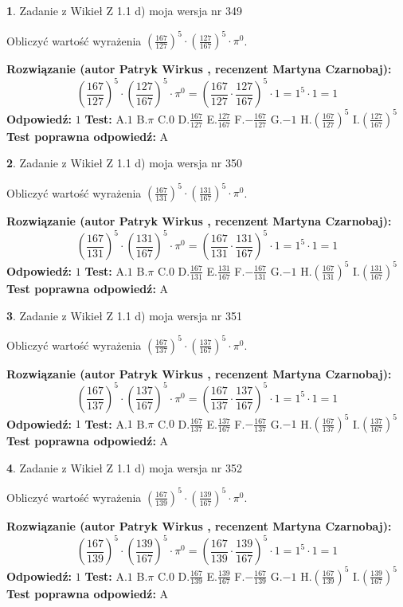 \documentclass[12pt, a4paper]{article}
\theoremstyle{definition} %
\newtheorem{zad}{}
\newcommand{\zadStart}[1]{\begin{zad}#1\newline}
\newcommand{\zadStop}{\end{zad}}
\newcommand{\rozwStart}[2]{\noindent \textbf{Rozwiązanie (autor #1 , recenzent #2): }\newline}
\newcommand{\rozwStop}{\newline}
\newcommand{\odpStart}{\noindent \textbf{Odpowiedź:}\newline}
\newcommand{\odpStop}{\newline}
\newcommand{\testStart}{\noindent \textbf{Test:}\newline}
\newcommand{\testStop}{\newline}
\newcommand{\kluczStart}{\noindent \textbf{Test poprawna odpowiedź:}\newline}
\newcommand{\kluczStop}{\newline}
\begin{document}
\zadStart{Zadanie z Wikieł Z 1.1 d) moja wersja nr 349}

Obliczyć wartość wyrażenia $(\frac{167}{127})^{5} \cdot (\frac{127}{167})^{5} \cdot \pi^{0}$.
\zadStop
\rozwStart{Patryk Wirkus}{Martyna Czarnobaj}
$$(\frac{167}{127})^{5} \cdot (\frac{127}{167})^{5} \cdot \pi^{0} = (\frac{167}{127} \cdot \frac{127}{167})^{5} \cdot 1 = 1^{5} \cdot 1 = 1$$
\rozwStop
\odpStart
$1$
\odpStop
\testStart
A.$1$ B.$\pi$ C.$0$ D.$\frac{167}{127}$ E.$\frac{127}{167}$
F.$-\frac{167}{127}$ G.$-1$
H.$(\frac{167}{127})^{5}$
I.$(\frac{127}{167})^{5}$
\testStop
\kluczStart
A
\kluczStop



\zadStart{Zadanie z Wikieł Z 1.1 d) moja wersja nr 350}

Obliczyć wartość wyrażenia $(\frac{167}{131})^{5} \cdot (\frac{131}{167})^{5} \cdot \pi^{0}$.
\zadStop
\rozwStart{Patryk Wirkus}{Martyna Czarnobaj}
$$(\frac{167}{131})^{5} \cdot (\frac{131}{167})^{5} \cdot \pi^{0} = (\frac{167}{131} \cdot \frac{131}{167})^{5} \cdot 1 = 1^{5} \cdot 1 = 1$$
\rozwStop
\odpStart
$1$
\odpStop
\testStart
A.$1$ B.$\pi$ C.$0$ D.$\frac{167}{131}$ E.$\frac{131}{167}$
F.$-\frac{167}{131}$ G.$-1$
H.$(\frac{167}{131})^{5}$
I.$(\frac{131}{167})^{5}$
\testStop
\kluczStart
A
\kluczStop



\zadStart{Zadanie z Wikieł Z 1.1 d) moja wersja nr 351}

Obliczyć wartość wyrażenia $(\frac{167}{137})^{5} \cdot (\frac{137}{167})^{5} \cdot \pi^{0}$.
\zadStop
\rozwStart{Patryk Wirkus}{Martyna Czarnobaj}
$$(\frac{167}{137})^{5} \cdot (\frac{137}{167})^{5} \cdot \pi^{0} = (\frac{167}{137} \cdot \frac{137}{167})^{5} \cdot 1 = 1^{5} \cdot 1 = 1$$
\rozwStop
\odpStart
$1$
\odpStop
\testStart
A.$1$ B.$\pi$ C.$0$ D.$\frac{167}{137}$ E.$\frac{137}{167}$
F.$-\frac{167}{137}$ G.$-1$
H.$(\frac{167}{137})^{5}$
I.$(\frac{137}{167})^{5}$
\testStop
\kluczStart
A
\kluczStop



\zadStart{Zadanie z Wikieł Z 1.1 d) moja wersja nr 352}

Obliczyć wartość wyrażenia $(\frac{167}{139})^{5} \cdot (\frac{139}{167})^{5} \cdot \pi^{0}$.
\zadStop
\rozwStart{Patryk Wirkus}{Martyna Czarnobaj}
$$(\frac{167}{139})^{5} \cdot (\frac{139}{167})^{5} \cdot \pi^{0} = (\frac{167}{139} \cdot \frac{139}{167})^{5} \cdot 1 = 1^{5} \cdot 1 = 1$$
\rozwStop
\odpStart
$1$
\odpStop
\testStart
A.$1$ B.$\pi$ C.$0$ D.$\frac{167}{139}$ E.$\frac{139}{167}$
F.$-\frac{167}{139}$ G.$-1$
H.$(\frac{167}{139})^{5}$
I.$(\frac{139}{167})^{5}$
\testStop
\kluczStart
A
\kluczStop
\end{document}
